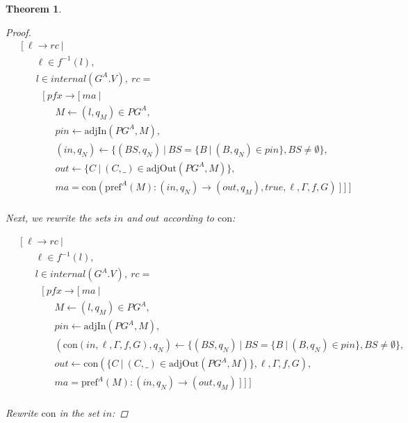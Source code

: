 \documentclass[twocolumn, openany]{sig-alternate-10pt}
\newcommand{\Con}{\mathrm{con}}
\newcommand{\Pref}{\ensuremath{\mathrm{pref}}}
\newtheorem{thm}{Theorem}
\begin{document}
\begin{thm}
\begin{proof}
      \[ \begin{array}{l}
     ~~~~~ [~ \ell \rightarrow rc ~\vert~ \\
     ~~~~~~~~~~~~ \ell \in f^{-1}(l), \\
     ~~~~~~~~~~~~ l \in internal(G^A.V), ~rc =  \\
     ~~~~~~~~~~~~~~~ [~ pfx \rightarrow [~ ma ~\vert~ \\
     ~~~~~~~~~~~~~~~~~~~~~ M \leftarrow (l,q_M) \in PG^A, \\
     ~~~~~~~~~~~~~~~~~~~~~ pin \leftarrow \text{adjIn}(PG^A,M), \\
     ~~~~~~~~~~~~~~~~~~~~~ (in,q_N) \leftarrow \{ (BS,q_N) ~\vert~ BS=\{B ~\vert~ (B,q_N) \in pin \}, BS \neq \emptyset \}, \\
     ~~~~~~~~~~~~~~~~~~~~~ out \leftarrow \{ C ~\vert~ (C,\_) \in \text{adjOut}(PG^A,M) \}, \\
     ~~~~~~~~~~~~~~~~~~~~~ ma = \Con(\Pref^A(M) : (in,q_N) \rightarrow (out,q_M), true, \ell, \Gamma, f, G) ~] ~] ~] \\
    \end{array} \]%

    Next, we rewrite the sets $in$ and $out$ according to $\Con$:

      \[ \begin{array}{l}
     ~~~~~ [~ \ell \rightarrow rc ~\vert~ \\
     ~~~~~~~~~~~~ \ell \in f^{-1}(l), \\
     ~~~~~~~~~~~~ l \in internal(G^A.V), ~rc =  \\
     ~~~~~~~~~~~~~~~ [~ pfx \rightarrow [~ ma ~\vert~ \\
     ~~~~~~~~~~~~~~~~~~~~~ M \leftarrow (l,q_M) \in PG^A, \\
     ~~~~~~~~~~~~~~~~~~~~~ pin \leftarrow \text{adjIn}(PG^A,M), \\
     ~~~~~~~~~~~~~~~~~~~~~ (\Con(in,\ell,\Gamma,f,G),q_N) \leftarrow \{ (BS,q_N) ~\vert~ BS=\{B ~\vert~ (B,q_N) \in pin \}, BS \neq \emptyset \}, \\
     ~~~~~~~~~~~~~~~~~~~~~ out \leftarrow \Con(\{ C ~\vert~ (C,\_) \in \text{adjOut}(PG^A,M) \}, \ell,\Gamma,f,G), \\
     ~~~~~~~~~~~~~~~~~~~~~ ma = \Pref^A(M) : (in,q_N) \rightarrow (out,q_M) ~] ~] ~] \\
  \end{array} \]%

  Rewrite $\Con$ in the set $in$:


\end{proof}
\end{thm}
\end{document}
